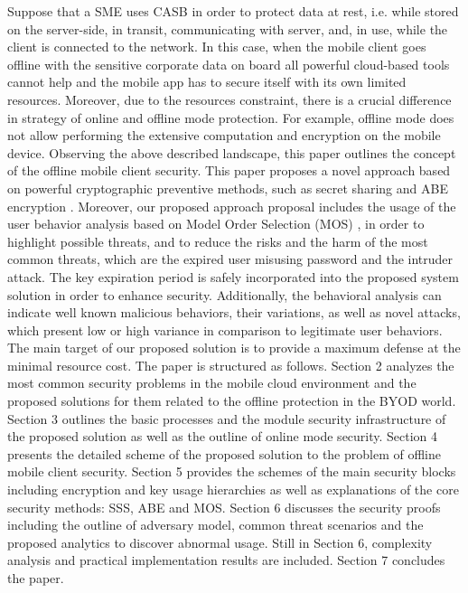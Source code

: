 \documentclass[twocolumn]{svjour3}          %
\begin{document}
Suppose that a SME uses CASB in order to protect data at rest, i.e. while stored on the server-side, in transit, communicating with server, and, in use, while the client is connected to the network. In this case, when the mobile client goes offline with the sensitive corporate data on board all powerful cloud-based tools cannot help and the mobile app has to secure itself with its own limited resources. Moreover, due to the resources constraint, there is a crucial difference in strategy of online and offline mode protection. For example, offline mode does not allow performing the extensive computation and encryption on the mobile device.
Observing the above described landscape, this paper outlines the concept of the offline mobile client security. This paper proposes a novel approach based on powerful cryptographic preventive methods, such as secret sharing \cite{galibus2007} and ABE encryption \cite{goyal2006attribute}. Moreover, our proposed approach proposal includes the usage of the user behavior analysis based on Model Order Selection (MOS) \cite{tenorio2013greatest}, in order to highlight possible threats, and to reduce the risks and the harm of the most common threats, which are the expired user misusing password and the intruder attack. The key expiration period is safely incorporated into the proposed system solution in order to enhance security. Additionally, the behavioral analysis can indicate well known malicious behaviors, their variations, as well as novel attacks, which present low or high variance in comparison to legitimate user behaviors. The main target of our proposed solution is to provide a maximum defense at the minimal resource cost.
The paper is structured as follows. Section 2 analyzes the most common security problems in the mobile cloud environment and the proposed solutions for them related to the offline protection in the BYOD world. Section 3 outlines the basic processes and the module security infrastructure of the proposed solution as well as the outline of online mode security. Section 4 presents the detailed scheme of the proposed solution to the problem of offline mobile client security. Section 5 provides the schemes of the main security blocks including encryption and key usage hierarchies as well as explanations of the core security methods: SSS, ABE and MOS. Section 6 discusses the security proofs including the outline of adversary model, common threat scenarios and the proposed analytics to discover abnormal usage. Still in Section 6, complexity analysis and practical implementation results are included. Section 7 concludes the paper.
\end{document}
